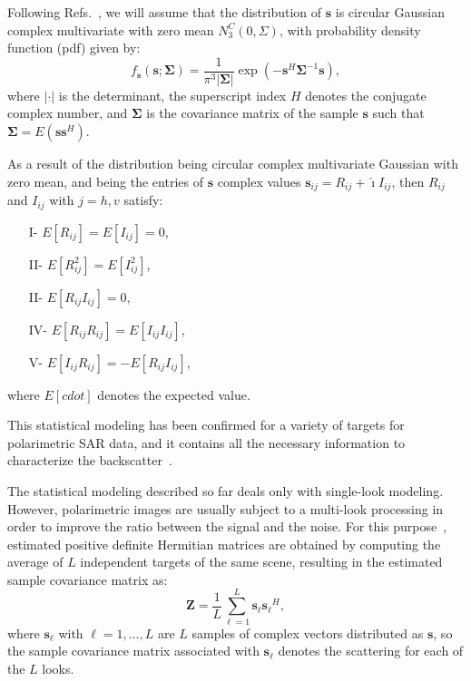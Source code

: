 \documentclass[conference]{IEEEtran}
\begin{document}
Following Refs.~\cite{good, lee}, we will assume that the distribution of $\mathbf{s}$ is circular Gaussian complex multivariate with zero mean $N^C_3(0,\Sigma)$, with probability density function (pdf) given by:
\begin{equation}
    f_{\mathbf{s}}(\mathbf{s};\mathbf{\Sigma})=\frac{1}{\pi^3|\mathbf{\Sigma}|} \exp(-\mathbf{s}^H\mathbf{\Sigma}^{-1}\mathbf{s}),
    \label{eq_03}
\end{equation}
where $|\cdot|$ is the determinant, 
the superscript index $H$ denotes the conjugate complex number, 
and $\mathbf{\Sigma}$ is the covariance matrix of the sample $\mathbf{s}$ such that $\mathbf{\Sigma}=E(\mathbf{ss}^H)$. 

As a result of the distribution being circular complex multivariate Gaussian with zero mean, and being the entries of $\mathbf{s}$ complex values $\mathbf{s}_{ij}= R_{ij}+ \hat{\imath} I_{ij}$, then $R_{ij}$ and $I_{ij}$ with $j=h,v$ satisfy:
\begin{itemize}
	\item[I-] $E[R_{ij}]=E[I_{ij}]=0$,
	\item[II-] $E[R_{ij}^2]=E[I_{ij}^2]$, 
	\item[II-] $E[R_{ij}I_{ij}]=0$,  
	\item[IV-] $E[R_{ij}R_{ij}]=E[I_{ij}I_{ij}]$, 
	\item[V-] $E[I_{ij}R_{ij}]=-E[R_{ij}I_{ij}]$,
\end{itemize}
where $E[cdot]$ denotes the expected value. 

This statistical modeling has been confirmed for a variety of targets for polarimetric SAR data, and it contains all the necessary information to characterize the backscatter~\cite{sarabendi,mfp}.
 
The statistical modeling described so far deals only with single-look modeling.
However, polarimetric images are usually subject to a multi-look processing in order to improve the ratio between the signal and the noise. 
For this purpose~\cite{good, ade}, estimated positive definite Hermitian matrices are obtained by computing the average of $L$ independent targets of the same scene, resulting in the estimated sample covariance matrix as:
\begin{equation}
    \mathbf{Z}=\frac{1}{L}\sum_{\ell=1}^{L} {\mathbf{s}_\ell}{\mathbf{s}_\ell}^H,
    \label{eq_04}
\end{equation}
where $\mathbf{s}_\ell$ with $\ell = 1, \dots, L$ are $L$ samples of complex vectors distributed as $\mathbf{s}$, so the sample covariance matrix associated with $\mathbf{s}_\ell$ denotes the scattering for each of the $L$ looks.
\end{document}

